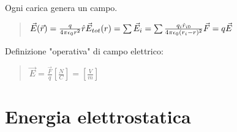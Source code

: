 \documentclass[a4paper, 12pt]{book}
\theoremstyle{plain}
\begin{document}
Ogni carica genera un campo.
\begin{quote}
    \begin{math}
        \vec{E}(\vec{r}) = \frac{q}{4\pi\epsilon_0r^2}\hat{r}
        \newline\vec{E}_{tot}(r) = \sum\vec{E}_i = \sum \frac{q_i\hat{r}_{i0}}{4\pi\epsilon_0(r_i-r)^2}
        \newline\vec{F} = q\vec{E}
    \end{math}
\end{quote}
Definizione "operativa" di campo elettrico:
\begin{quote}
    \begin{math}
        \vec{E} = \frac{\vec{F}}{q} [\frac{N}{C}] = [\frac{V}{m}]
    \end{math}
\end{quote}

\section{Energia elettrostatica}
\end{document}
